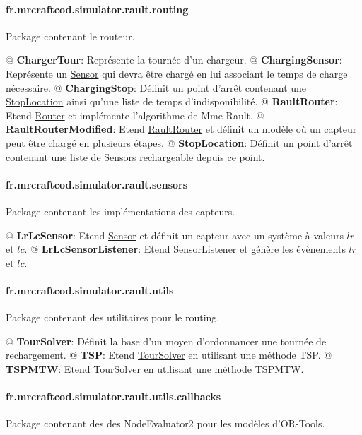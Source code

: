 \documentclass[final]{polytech/polytech}
\newcommand{\class}[1]{\textbf{#1}\label{class:#1}}
\newcommand{\klass}[1]{\hyperref[class:#1]{#1}}
\begin{document}
			\paragraph{fr.mrcraftcod.simulator.rault.routing}
				Package contenant le routeur.
				
				\begin{easylist}
					@ \class{ChargerTour}: Représente la tournée d'un chargeur.
					@ \class{ChargingSensor}: Représente un \klass{Sensor} qui devra être chargé en lui associant le temps de charge nécessaire.
					@ \class{ChargingStop}: Définit un point d'arrêt contenant une \klass{StopLocation} ainsi qu'une liste de temps d'indisponibilité.
					@ \class{RaultRouter}: Etend \klass{Router} et implémente l'algorithme de Mme Rault.
					@ \class{RaultRouterModified}: Etend \klass{RaultRouter} et définit un modèle où un capteur peut être chargé en plusieurs étapes.
					@ \class{StopLocation}: Définit un point d'arrêt contenant une liste de \klass{Sensor}s rechargeable depuis ce point.
				\end{easylist}
			
			\paragraph{fr.mrcraftcod.simulator.rault.sensors}
				Package contenant les implémentations des capteurs.
				
				\begin{easylist}
					@ \class{LrLcSensor}: Etend \klass{Sensor} et définit un capteur avec un système à valeurs $lr$ et $lc$.
					@ \class{LrLcSensorListener}: Etend \klass{SensorListener} et génère les évènements $lr$ et $lc$.
				\end{easylist}
			
			\paragraph{fr.mrcraftcod.simulator.rault.utils}
				Package contenant des utilitaires pour le routing.
				
				\begin{easylist}
					@ \class{TourSolver}: Définit la base d'un moyen d'ordonnancer une tournée de rechargement.
					@ \class{TSP}: Etend \klass{TourSolver} en utilisant une méthode TSP.
					@ \class{TSPMTW}: Etend \klass{TourSolver} en utilisant une méthode TSPMTW.
				\end{easylist}
				
			\paragraph{fr.mrcraftcod.simulator.rault.utils.callbacks}
				Package contenant des des NodeEvaluator2 pour les modèles d'OR-Tools.
				
\end{document}
